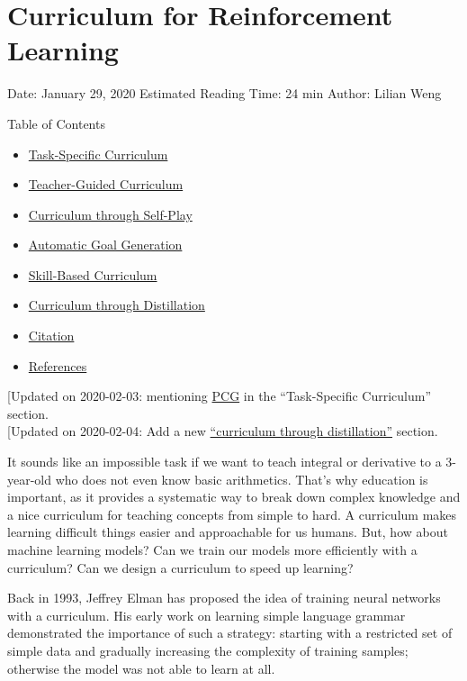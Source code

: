 \section{Curriculum for Reinforcement Learning}\label{curriculum-for-reinforcement-learning}

Date: January 29, 2020 \textbar{} Estimated Reading Time: 24 min \textbar{} Author: Lilian Weng

{Table of Contents}

\begin{itemize}
\tightlist
\item
  \hyperref[task-specific-curriculum]{Task-Specific Curriculum}
\item
  \hyperref[teacher-guided-curriculum]{Teacher-Guided Curriculum}
\item
  \hyperref[curriculum-through-self-play]{Curriculum through Self-Play}
\item
  \hyperref[automatic-goal-generation]{Automatic Goal Generation}
\item
  \hyperref[skill-based-curriculum]{Skill-Based Curriculum}
\item
  \hyperref[curriculum-through-distillation]{Curriculum through Distillation}
\item
  \hyperref[citation]{Citation}
\item
  \hyperref[references]{References}
\end{itemize}

{{[}Updated on 2020-02-03: mentioning \hyperref[pcg]{PCG} in the ``Task-Specific Curriculum'' section.}\\
{{[}Updated on 2020-02-04: Add a new \hyperref[curriculum-through-distillation]{``curriculum through distillation''} section.}

It sounds like an impossible task if we want to teach integral or derivative to a 3-year-old who does not even know basic arithmetics. That's why education is important, as it provides a systematic way to break down complex knowledge and a nice curriculum for teaching concepts from simple to hard. A curriculum makes learning difficult things easier and approachable for us humans. But, how about machine learning models? Can we train our models more efficiently with a curriculum? Can we design a curriculum to speed up learning?

Back in 1993, Jeffrey Elman has proposed the idea of training neural networks with a curriculum. His early work on learning simple language grammar demonstrated the importance of such a strategy: starting with a restricted set of simple data and gradually increasing the complexity of training samples; otherwise the model was not able to learn at all.

